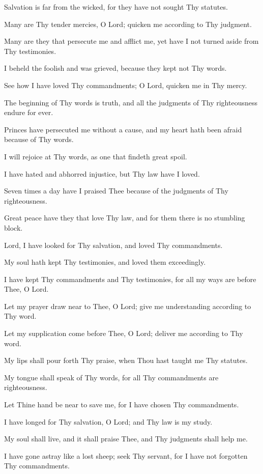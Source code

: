 Salvation is far from the wicked, for they have not sought Thy statutes.

Many are Thy tender mercies, O Lord; quicken me according to Thy judgment.

Many are they that persecute me and afflict me, yet have I not turned aside from Thy testimonies.

I beheld the foolish and was grieved, because they kept not Thy words.

See how I have loved Thy commandments; O Lord, quicken me in Thy mercy.

The beginning of Thy words is truth, and all the judgments of Thy righteousness endure for ever.

Princes have persecuted me without a cause, and my heart hath been afraid because of Thy words.

I will rejoice at Thy words, as one that findeth great spoil.

I have hated and abhorred injustice, but Thy law have I loved.

Seven times a day have I praised Thee because of the judgments of Thy righteousness.

Great peace have they that love Thy law, and for them there is no stumbling block.

Lord, I have looked for Thy salvation, and loved Thy commandments.

My soul hath kept Thy testimonies, and loved them exceedingly.

I have kept Thy commandments and Thy testimonies, for all my ways are before Thee, O Lord.

Let my prayer draw near to Thee, O Lord; give me understanding according to Thy word.

Let my supplication come before Thee, O Lord; deliver me according to Thy word.

My lips shall pour forth Thy praise, when Thou hast taught me Thy statutes.

My tongue shall speak of Thy words, for all Thy commandments are righteousness.

Let Thine hand be near to save me, for I have chosen Thy commandments.

I have longed for Thy salvation, O Lord; and Thy law is my study.

My soul shall live, and it shall praise Thee, and Thy judgments shall help me.

I have gone astray like a lost sheep; seek Thy servant, for I have not forgotten Thy commandments.
